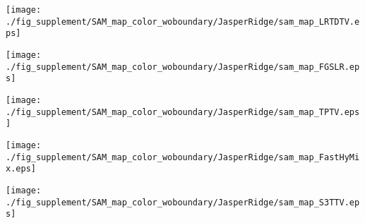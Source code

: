 \begin{figure*}[t]
\begin{center}
		\vspace{2mm}
		
		\begin{minipage}{0.15\hsize}
			\centerline{\hspace{\hsize}} %
		\end{minipage}
		\begin{minipage}{0.15\hsize}
			\centerline{\texttt{[image: ./fig\_supplement/SAM\_map\_color\_woboundary/JasperRidge/sam\_map\_LRTDTV.eps]}} %
		\end{minipage}
		\begin{minipage}{0.15\hsize}
			\centerline{\texttt{[image: ./fig\_supplement/SAM\_map\_color\_woboundary/JasperRidge/sam\_map\_FGSLR.eps]}} %
		\end{minipage}
		\begin{minipage}{0.15\hsize}
			\centerline{\texttt{[image: ./fig\_supplement/SAM\_map\_color\_woboundary/JasperRidge/sam\_map\_TPTV.eps]}} %
		\end{minipage}
		\begin{minipage}{0.15\hsize}
			\centerline{\texttt{[image: ./fig\_supplement/SAM\_map\_color\_woboundary/JasperRidge/sam\_map\_FastHyMix.eps]}} %
		\end{minipage}
		\begin{minipage}{0.15\hsize}
			\centerline{\texttt{[image: ./fig\_supplement/SAM\_map\_color\_woboundary/JasperRidge/sam\_map\_S3TTV.eps]}} %
		\end{minipage}
		\begin{minipage}{0.050\hsize}
			\centerline{\hspace{\hsize}} %
		\end{minipage}
		
		\vspace{1mm}
		

\end{center}
\end{figure*}
